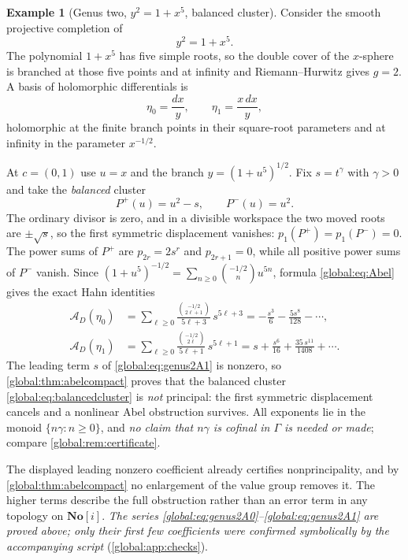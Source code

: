 \documentclass[11pt,letterpaper]{article}
\theoremstyle{definition}
\newtheorem{example}[example]{Example}
\theoremstyle{remark}
\newcommand{\No}{\mathbf{No}}
\numberwithin{equation}{section}
\begin{document}
\begin{example}[Genus two, $y^2=1+x^5$, balanced cluster]\label{global:ex:genustwo}
Consider the smooth projective completion of
\begin{equation}\label{global:eq:hyperelliptic}
  y^2=1+x^5 .
\end{equation}
The polynomial $1+x^5$ has five simple roots, so the double cover of the $x$-sphere is branched at those five points and at infinity and Riemann--Hurwitz gives $g=2$. A basis of holomorphic differentials is
\begin{equation}\label{global:eq:genus2forms}
  \eta_0=\frac{dx}{y},\qquad\eta_1=\frac{x\,dx}{y},
\end{equation}
holomorphic at the finite branch points in their square-root parameters and at infinity in the parameter $x^{-1/2}$.

At $c=(0,1)$ use $u=x$ and the branch $y=(1+u^5)^{1/2}$. Fix $s=t^\gamma$ with $\gamma>0$ and take the \emph{balanced} cluster
\begin{equation}\label{global:eq:balancedcluster}
  P^+(u)=u^2-s,\qquad P^-(u)=u^2 .
\end{equation}
The ordinary divisor is zero, and in a divisible workspace the two moved roots are $\pm\sqrt s$, so the first symmetric displacement vanishes: $p_1(P^+)=p_1(P^-)=0$. The power sums of $P^+$ are $p_{2r}=2s^r$ and $p_{2r+1}=0$, while all positive power sums of $P^-$ vanish. Since $(1+u^5)^{-1/2}=\sum_{n\ge0}\binom{-1/2}{n}u^{5n}$, formula \eqref{global:eq:Abel} gives the exact Hahn identities
\begin{align}
  \mathcal A_D(\eta_0)&=\sum_{\ell\ge0}\frac{\binom{-1/2}{2\ell+1}}{5\ell+3}\,s^{5\ell+3}
   =-\frac{s^3}{6}-\frac{5s^8}{128}-\cdots,\label{global:eq:genus2A0}\\
  \mathcal A_D(\eta_1)&=\sum_{\ell\ge0}\frac{\binom{-1/2}{2\ell}}{5\ell+1}\,s^{5\ell+1}
   =s+\frac{s^6}{16}+\frac{35\,s^{11}}{1408}+\cdots.\label{global:eq:genus2A1}
\end{align}
The leading term $s$ of \eqref{global:eq:genus2A1} is nonzero, so \cref{global:thm:abelcompact} proves that the balanced cluster \eqref{global:eq:balancedcluster} is \emph{not} principal: the first symmetric displacement cancels and a nonlinear Abel obstruction survives. All exponents lie in the monoid $\{n\gamma:n\ge0\}$, and \emph{no claim that $n\gamma$ is cofinal in $\Gamma$ is needed or made}; compare \cref{global:rem:certificate}.
\end{example}

The displayed leading nonzero coefficient already certifies nonprincipality, and by \cref{global:thm:abelcompact} no enlargement of the value group removes it. The higher terms describe the full obstruction rather than an error term in any topology on $\No[i]$. \emph{The series \eqref{global:eq:genus2A0}--\eqref{global:eq:genus2A1} are proved above; only their first few coefficients were confirmed symbolically by the accompanying script} (\cref{global:app:checks}).
\end{document}
